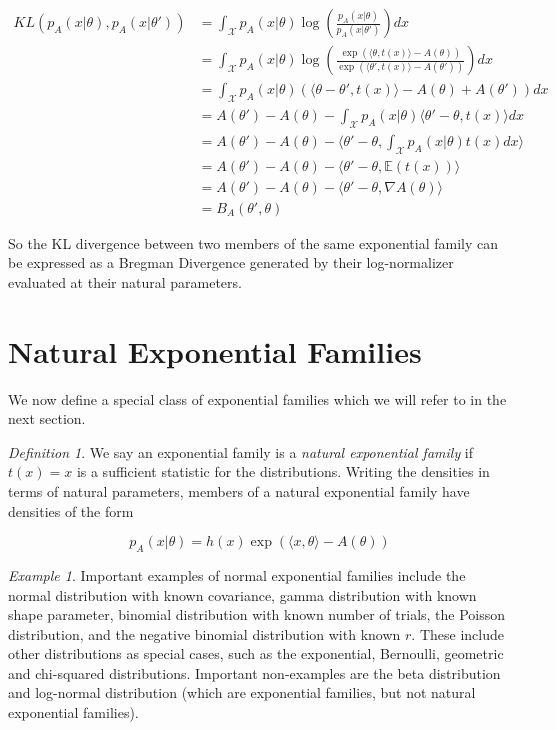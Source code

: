 \documentclass[BSc]{usydthesis}
\numberwithin{equation}{chapter}
\theoremstyle{remark}
\newtheorem{Definition}[equation]{Definition}
\newtheorem{Example}[equation]{Example}
\begin{document}
\begin{align*}
 KL(p_A(x|\theta) , p_A(x|\theta')) &= \int_{\mathcal{X}} p_A(x|\theta) \log \left( \frac{ p_A(x|\theta) }{ p_A(x|\theta') }\right) dx \\
 &= \int_{\mathcal{X}} p_A(x|\theta) \log \left( \frac{\exp(\langle \theta, t(x)\rangle - A(\theta)) }{\exp(\langle \theta', t(x)\rangle - A(\theta')) }\right) dx \\
 &= \int_{\mathcal{X}} p_A(x|\theta) \left( \langle \theta - \theta', t(x) \rangle - A(\theta) + A(\theta') \right) dx \\
 &= A(\theta') - A(\theta) - \int_{\mathcal{X}} p_A(x|\theta) \langle \theta'-\theta, t(x) \rangle dx \\
 &= A(\theta')-A(\theta) - \bigg\langle \theta'-\theta, \int_{\mathcal{X}} p_A(x|\theta) t(x) dx \bigg\rangle \\
 &= A(\theta')-A(\theta) - \langle \theta'-\theta, \mathbb{E}(t(x))\rangle\\
 &= A(\theta')-A(\theta) - \langle \theta'-\theta, \nabla A(\theta) \rangle \\
 &= B_A(\theta', \theta)
 \end{align*}
 
 So the KL divergence between two members of the same exponential family can be expressed as a Bregman Divergence generated by their log-normalizer evaluated at their natural parameters. 

\section{Natural Exponential Families}
We now define a special class of exponential families which we will refer to in the next section.

\begin{Definition}
 We say an exponential family is a {\em natural exponential family} if $t(x)=x$ is a sufficient statistic for the distributions. Writing the densities in terms of natural parameters, members of a natural exponential family have densities of the form 
 
 $$ p_A(x|\theta) = h(x) \exp( \langle x, \theta \rangle - A(\theta))$$
\end{Definition}

\begin{Example}
 Important examples of normal exponential families include the normal distribution with known covariance, gamma distribution with known shape parameter, binomial distribution with known number of trials, the Poisson distribution, and the negative binomial distribution with known $r.$ These include other distributions as special cases, such as the exponential, Bernoulli, geometric and chi-squared distributions. Important non-examples are the beta distribution and log-normal distribution (which are exponential families, but not natural exponential families). 
\end{Example}
\end{document}
